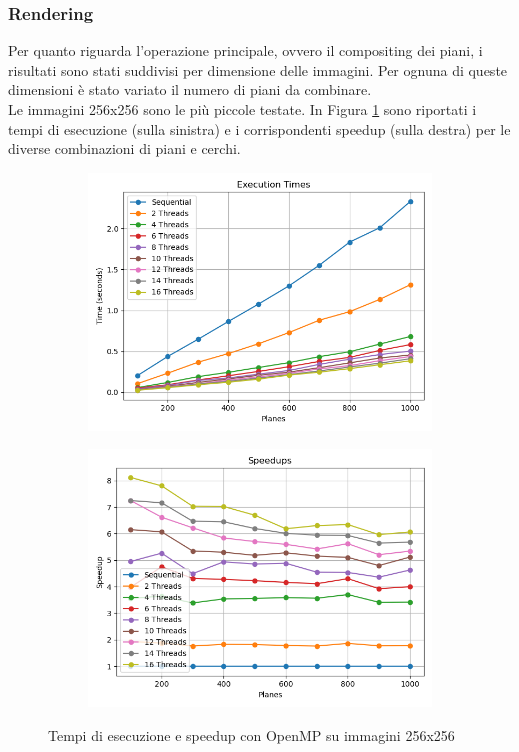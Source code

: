 \subsubsection{Rendering}
Per quanto riguarda l'operazione principale, ovvero il compositing dei piani, i risultati sono stati suddivisi per dimensione delle immagini.
Per ognuna di queste dimensioni è stato variato il numero di piani da combinare.\\
Le immagini 256x256 sono le più piccole testate.
In Figura \ref{fig:omp_256} sono riportati i tempi di esecuzione (sulla sinistra) e i corrispondenti speedup (sulla destra) per le diverse combinazioni di piani e cerchi.
\begin{figure}[H]
    \centering
    \begin{subfigure}{0.49\textwidth}
        \centering
        \includegraphics[width=\textwidth]{../result_16/plots/256/results_times}
    \end{subfigure}
    \begin{subfigure}{0.49\textwidth}
        \centering
        \includegraphics[width=\textwidth]{../result_16/plots/256/results_speedup}
    \end{subfigure}
    \caption{Tempi di esecuzione e speedup con OpenMP su immagini 256x256}
    \label{fig:omp_256}
\end{figure}
